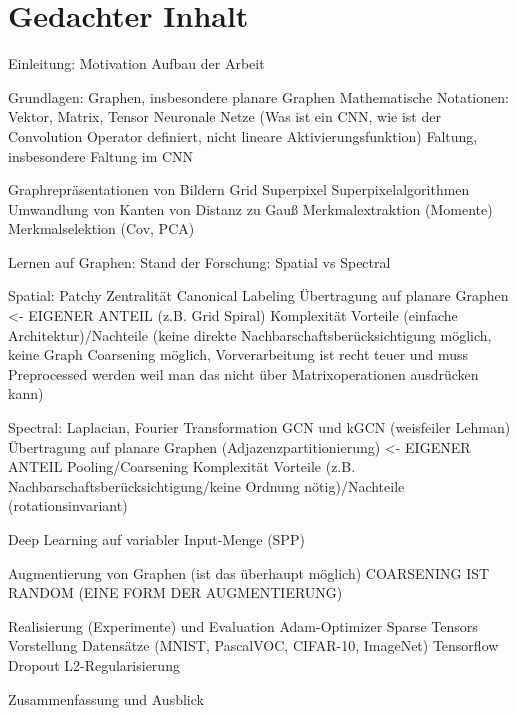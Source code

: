 \chapter{Gedachter Inhalt}

Einleitung:
Motivation
Aufbau der Arbeit

Grundlagen:
Graphen, insbesondere planare Graphen
Mathematische Notationen: Vektor, Matrix, Tensor
Neuronale Netze (Was ist ein CNN, wie ist der Convolution Operator definiert, nicht lineare Aktivierungsfunktion)
Faltung, insbesondere Faltung im CNN

Graphrepräsentationen von Bildern
Grid
Superpixel
Superpixelalgorithmen
Umwandlung von Kanten von Distanz zu Gauß
Merkmalextraktion (Momente)
Merkmalselektion (Cov, PCA)

Lernen auf Graphen:
Stand der Forschung: Spatial vs Spectral

Spatial:
Patchy
Zentralität
Canonical Labeling
Übertragung auf planare Graphen <- EIGENER ANTEIL (z.B. Grid Spiral)
Komplexität
Vorteile (einfache Architektur)/Nachteile (keine direkte Nachbarschaftsberücksichtigung möglich, keine Graph Coarsening möglich, Vorverarbeitung ist recht teuer und muss Preprocessed werden weil man das nicht über Matrixoperationen ausdrücken kann)

Spectral:
Laplacian, Fourier Transformation
GCN und kGCN (weisfeiler Lehman)
Übertragung auf planare Graphen (Adjazenzpartitionierung) <- EIGENER ANTEIL
Pooling/Coarsening
Komplexität
Vorteile (z.B. Nachbarschaftsberücksichtigung/keine Ordnung nötig)/Nachteile (rotationsinvariant)

Deep Learning auf variabler Input-Menge (SPP)

Augmentierung von Graphen (ist das überhaupt möglich)
COARSENING IST RANDOM (EINE FORM DER AUGMENTIERUNG)

Realisierung (Experimente) und Evaluation
Adam-Optimizer
Sparse Tensors
Vorstellung Datensätze (MNIST, PascalVOC, CIFAR-10, ImageNet)
Tensorflow
Dropout L2-Regularisierung

Zusammenfassung und Ausblick
